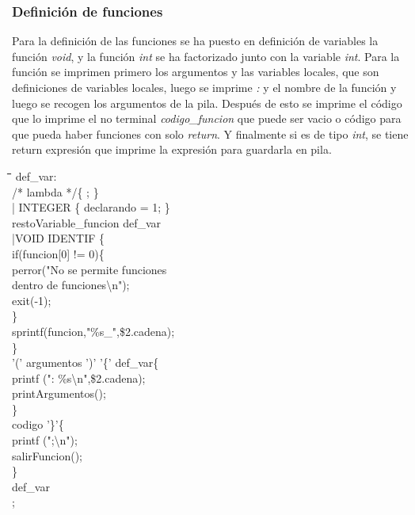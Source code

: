 \documentclass[11pt,spanish]{article}
\begin{document}
		\subsubsection*{Definición de funciones}
		Para la definición de las funciones se ha puesto en definición de variables la función \textit{void}, y la función \textit{int} se ha factorizado junto con la variable \textit{int}. Para la función se imprimen primero los argumentos y las variables locales, que son definiciones de variables locales, luego se imprime \textit{:} y el nombre de la función y luego se recogen los argumentos de la pila. Después de esto se imprime el código que lo imprime el no terminal \textit{codigo\_funcion} que puede ser vacio o código para que pueda haber funciones con solo \textit{return}. Y finalmente si es de tipo \textit{int}, se tiene return expresión que imprime la expresión para guardarla en pila.
		\begin{tcolorbox}
		\begin{tabbing}
			\hspace*{0.5cm}\=\hspace*{0.5cm}\= \hspace*{6cm}\=\hspace*{1cm}\=\hspace*{0.5cm}\=\hspace*{0.5cm}\=\kill
			def\_var:\\
			\>/* lambda */\{ ; \}\\
			\>| INTEGER \{ declarando = 1; \}\\
			\>\>restoVariable\_funcion def\_var\\
			\>|VOID IDENTIF\>\> \{\\
			\>\>\>\>if(funcion[0] != 0)\{\\
			\>\>\>\>\>perror("No se permite funciones\\
			\>\>\>\>\>\>dentro de funciones\textbackslash n");\\
			\>\>\>\>\>exit(-1);\\
			\>\>\>\>\>\}\\
			\>\>\>\>sprintf(funcion,"\%s\_",\$2.cadena);\\
			\>\>\>\}\\
			\>\>'(' argumentos ')' '\{' def\_var\>\{\\
			\>\>\>\>printf (": \%s\textbackslash n",\$2.cadena);\\
			\>\>\>\>printArgumentos();\\
			\>\>\>\}\\
			\>\>codigo '\}'\>\{\\
			\>\>\>\>printf (";\textbackslash n");\\
			\>\>\>\>salirFuncion();\\
			\>\>\>\}\\
			\>\>def\_var\\
			;
		\end{tabbing}
		\end{tcolorbox}
\end{document}
